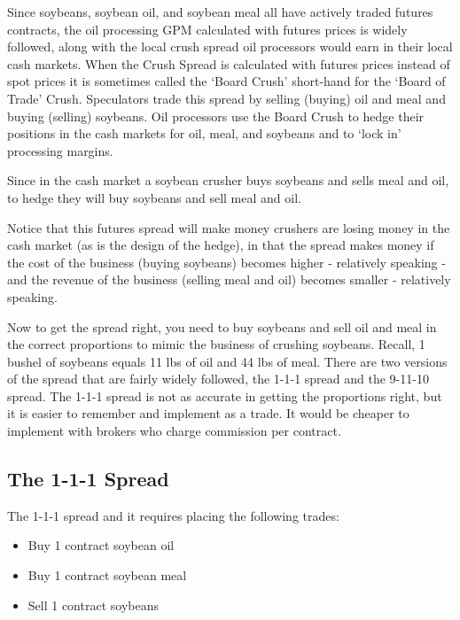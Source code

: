 \documentclass[
  letterpaper,
  DIV=11,
  numbers=noendperiod]{scrreprt}
\providecommand{\tightlist}{%
  \setlength{\itemsep}{0pt}\setlength{\parskip}{0pt}}\usepackage{longtable,booktabs,array}
\begin{document}
Since soybeans, soybean oil, and soybean meal all have actively traded
futures contracts, the oil processing GPM calculated with futures prices
is widely followed, along with the local crush spread oil processors
would earn in their local cash markets. When the Crush Spread is
calculated with futures prices instead of spot prices it is sometimes
called the `Board Crush' short-hand for the `Board of Trade' Crush.
Speculators trade this spread by selling (buying) oil and meal and
buying (selling) soybeans. Oil processors use the Board Crush to hedge
their positions in the cash markets for oil, meal, and soybeans and to
`lock in' processing margins.

Since in the cash market a soybean crusher buys soybeans and sells meal
and oil, to hedge they will buy soybeans and sell meal and oil.

Notice that this futures spread will make money crushers are losing
money in the cash market (as is the design of the hedge), in that the
spread makes money if the cost of the business (buying soybeans) becomes
higher - relatively speaking - and the revenue of the business (selling
meal and oil) becomes smaller - relatively speaking.

Now to get the spread right, you need to buy soybeans and sell oil and
meal in the correct proportions to mimic the business of crushing
soybeans. Recall, 1 bushel of soybeans equals 11 lbs of oil and 44 lbs
of meal. There are two versions of the spread that are fairly widely
followed, the 1-1-1 spread and the 9-11-10 spread. The 1-1-1 spread is
not as accurate in getting the proportions right, but it is easier to
remember and implement as a trade. It would be cheaper to implement with
brokers who charge commission per contract.

\hypertarget{the-1-1-1-spread}{%
\subsection{The 1-1-1 Spread}\label{the-1-1-1-spread}}

The 1-1-1 spread and it requires placing the following trades:

\begin{itemize}
\tightlist
\item
  Buy 1 contract soybean oil
\item
  Buy 1 contract soybean meal
\item
  Sell 1 contract soybeans
\end{itemize}
\end{document}

